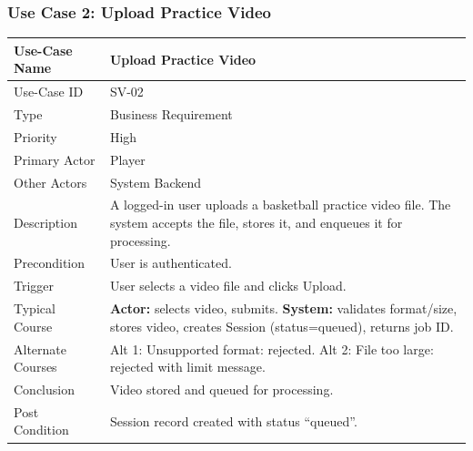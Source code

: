 ﻿\documentclass[11pt,a4paper]{article}
\begin{document}
\subsubsection*{Use Case 2: Upload Practice Video}
\begin{longtable}{|L{3.5cm}|L{11cm}|}
\hline
Use-Case Name & Upload Practice Video \\ \hline
Use-Case ID & SV-02 \\ \hline
Type & Business Requirement \\ \hline
Priority & High \\ \hline
Primary Actor & Player \\ \hline
Other Actors & System Backend \\ \hline
Description & A logged-in user uploads a basketball practice video file. The system accepts the file, stores it, and enqueues it for processing. \\ \hline
Precondition & User is authenticated. \\ \hline
Trigger & User selects a video file and clicks Upload. \\ \hline
Typical Course & \textbf{Actor:} selects video, submits. \textbf{System:} validates format/size, stores video, creates Session (status=queued), returns job ID. \\ \hline
Alternate Courses & Alt 1: Unsupported format: rejected. Alt 2: File too large: rejected with limit message. \\ \hline
Conclusion & Video stored and queued for processing. \\ \hline
Post Condition & Session record created with status ``queued''. \\ \hline
\end{longtable}
\end{document}
